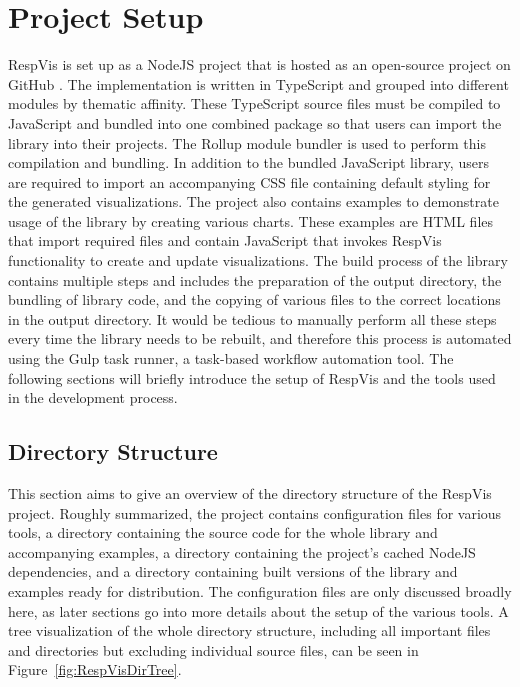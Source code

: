 \section{Project Setup}
\label{sec:ProjectSetup}

RespVis is set up as a NodeJS \parencite{NodeJS} project that is hosted as an open-source project on GitHub \parencite{RespVisGitHub}.
The implementation is written in TypeScript and grouped into different modules by thematic affinity. 
These TypeScript source files must be compiled to JavaScript and bundled into one combined package so that users can import the library into their projects.
The Rollup module bundler \parencite{Rollup} is used to perform this compilation and bundling.
In addition to the bundled JavaScript library, users are required to import an accompanying CSS file containing default styling for the generated visualizations.
The project also contains examples to demonstrate usage of the library by creating various charts.
These examples are HTML files that import required files and contain JavaScript that invokes RespVis functionality to create and update visualizations.
The build process of the library contains multiple steps and includes the preparation of the output directory, the bundling of library code, and the copying of various files to the correct locations in the output directory.
It would be tedious to manually perform all these steps every time the library needs to be rebuilt, and therefore this process is automated using the Gulp \parencite{Gulp} task runner, a task-based workflow automation tool.
The following sections will briefly introduce the setup of RespVis and the tools used in the development process.  

\subsection{Directory Structure}

This section aims to give an overview of the directory structure of the RespVis project.
Roughly summarized, the project contains configuration files for various tools, a  directory containing the source code for the whole library and accompanying examples, a  directory containing the project's cached NodeJS dependencies, and a  directory containing built versions of the library and examples ready for distribution.
The configuration files are only discussed broadly here, as later sections go into more details about the setup of the various tools.
A tree visualization of the whole directory structure, including all important files and directories but excluding individual source files, can be seen in Figure~\ref{fig:RespVisDirTree}.

